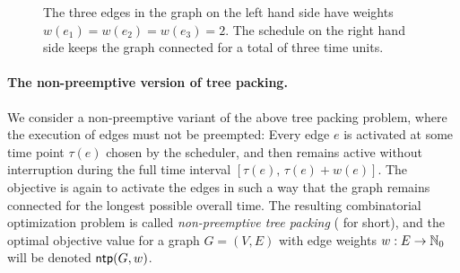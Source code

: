 \begin{figure}[tbh]
\begin{center}
\qquad\qquad
\end{center}
\caption{The three edges in the graph on the left hand side have weights $w(e_1)=w(e_2)=w(e_3)=2$.
The schedule on the right hand side keeps the graph connected for a total of three time units.}
\label{fig:example}

\vspace{-0.8cm}
\end{figure}

\paragraph{The non-preemptive version of tree packing.}
We consider a non-preemptive variant of the above tree packing problem,
where the execution of edges must not be preempted: 
Every edge $e$ is activated at some time point $\tau(e)$ chosen by the scheduler, and then 
remains active without interruption during the full time interval $[\tau(e),\,\tau(e)+w(e)]$.
The objective is again to activate the edges in such a way that the graph
remains connected for the longest possible overall time.
The resulting combinatorial optimization problem is called \emph{non-preemptive tree packing}
({\xxxNTP} for short), and the optimal objective value for a graph $G=(V,E)$ with edge 
weights $w:E\to\mathbb{N}_0$ will be denoted $\operatorname{\textsf{ntp}}(G,w)$.

